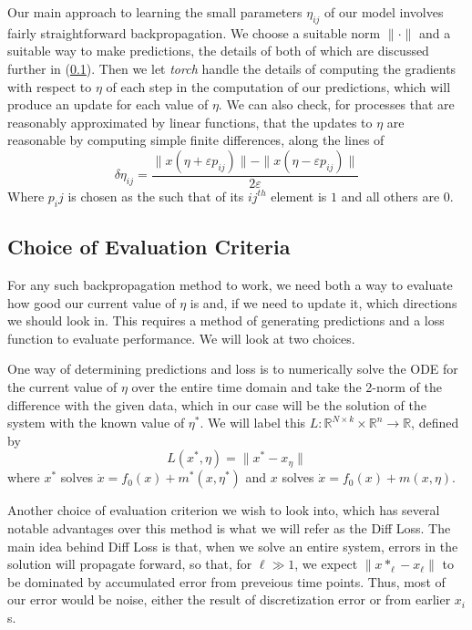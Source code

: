 \documentclass[12pt]{article}
\begin{document}
Our main approach to learning the small parameters $\eta_{ij}$ of our model involves fairly straightforward backpropagation. We choose a suitable norm $\|\cdot\|$ and a suitable way to make predictions, the details of both of which are discussed further in (\ref{norms}). Then we let \textit{torch} handle the details of computing the gradients with respect to $\eta$ of each step in the computation of our predictions, which will produce an update for each value of $\eta$. We can also check, for processes that are reasonably approximated by linear functions, that the updates to $\eta$ are reasonable by computing simple finite differences, along the lines of $$\delta\eta_{ij} = \frac{ \| x(\eta + \varepsilon p_{ij}) \| - \| x(\eta - \varepsilon p_{ij}) \| }{2 \varepsilon}$$ Where $p_ij$ is chosen as the such that of its $ij^{th}$ element is $1$ and all others are $0$.



\subsection{Choice of Evaluation Criteria}\label{norms}

For any such backpropagation method to work, we need both a way to evaluate how good our current value of $\eta$ is and, if we need to update it, which directions we should look in. This requires a method of generating predictions and a loss function to evaluate performance. We will look at two choices.

One way of determining predictions and loss is to numerically solve the ODE for the current value of $\eta$ over the entire time domain and take the 2-norm of the difference with the given data, which in our case will be the solution of the system with the known value of $\eta^*$. We will label this $L: \mathbb{R}^{N \times k} \times \mathbb{R}^n \to \mathbb{R}$, defined by $$ L(x^*, \eta) = \| x^* - x_{\eta} \| $$ where $x^*$ solves $\dot{x}=f_0(x)+m^*(x,\eta^*)$ and $x$ solves $\dot{x}=f_0(x)+m(x,\eta)$.

Another choice of evaluation criterion we wish to look into, which has several notable advantages over this method is what we will refer as the Diff Loss. The main idea behind Diff Loss is that, when we solve an entire system, errors in the solution will propagate forward, so that, for $\ell \gg 1$, we expect $\| x*_{\ell} - x_{\ell} \|$ to be dominated by accumulated error from preveious time points. Thus, most of our error would be noise, either the result of discretization error or from earlier $x_i$s.
\end{document}
